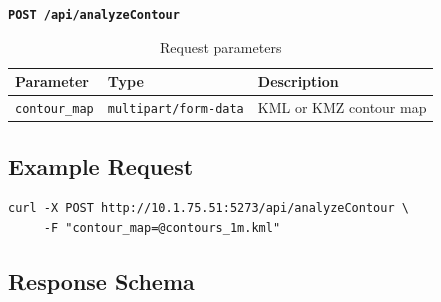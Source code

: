 \documentclass[12pt,a4paper]{article}
\begin{document}
\begin{center}
\large\textbf{\texttt{POST /api/analyzeContour}}
\end{center}

\begin{table}[H]
\centering
\begin{tabular}{@{}lll@{}}
\toprule
\textbf{Parameter} & \textbf{Type} & \textbf{Description} \\
\midrule
\texttt{contour\_map} & \texttt{multipart/form-data} & KML or KMZ contour map \\
\bottomrule
\end{tabular}
\caption{Request parameters}
\end{table}

\subsection{Example Request}

\begin{lstlisting}[style=bash]
curl -X POST http://10.1.75.51:5273/api/analyzeContour \
     -F "contour_map=@contours_1m.kml"
\end{lstlisting}

\subsection{Response Schema}
\end{document}

